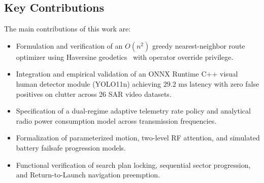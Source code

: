 \subsection{Key Contributions}
The main contributions of this work are:
\begin{itemize}
    \item Formulation and verification of an $O(n^2)$ greedy nearest-neighbor route optimizer using Haversine geodetics~\cite{sinnott1984haversine} with operator override privilege.
    \item Integration and empirical validation of an ONNX Runtime C++ visual human detector module (YOLO11n) achieving $29.2\text{ ms}$ latency with zero false positives on clutter across 26 SAR video datasets.
    \item Specification of a dual-regime adaptive telemetry rate policy and analytical radio power consumption model across transmission frequencies.
    \item Formalization of parameterized motion, two-level RF attention, and simulated battery failsafe progression models.
    \item Functional verification of search plan locking, sequential sector progression, and Return-to-Launch navigation preemption.
\end{itemize}

